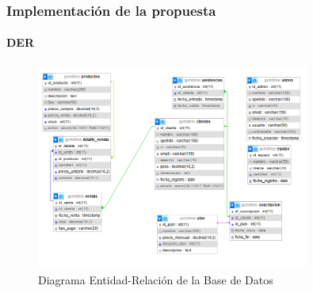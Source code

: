 \documentclass[12pt, letterpaper]{article}
\begin{document}
\subsubsection{Implementación de la propuesta}
\paragraph{DER}
\begin{figure}[h]
\centering
\includegraphics[width=0.8\textwidth]{der.png}
\caption{Diagrama Entidad-Relación de la Base de Datos}
\label{fig:der}
\end{figure}
\newpage
\end{document}
